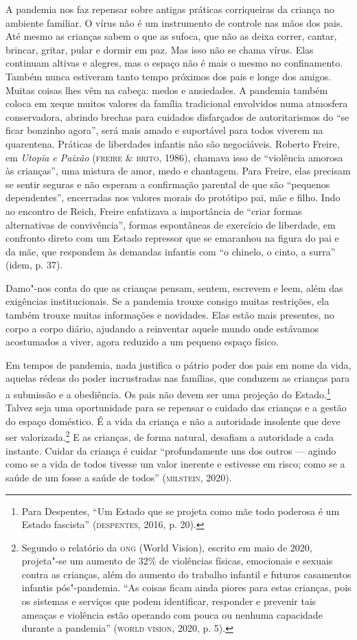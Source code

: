 A pandemia nos faz repensar sobre antigas práticas corriqueiras da
criança no ambiente familiar. O vírus não é um instrumento de controle
nas mãos dos pais. Até mesmo as crianças sabem o que as sufoca, que não
as deixa correr, cantar, brincar, gritar, pular e dormir em paz. Mas
isso não se chama vírus. Elas continuam altivas e alegres, mas o espaço
não é mais o mesmo no confinamento. Também nunca estiveram tanto tempo
próximos dos pais e longe dos amigos. Muitas coisas lhes vêm na cabeça:
medos e ansiedades. A pandemia também coloca em xeque muitos valores da
família tradicional envolvidos numa atmosfera conservadora, abrindo
brechas para cuidados disfarçados de autoritarismos do ``se ficar
bonzinho agora'', será mais amado e suportável para todos viverem na
quarentena. Práticas de liberdades infantis não são negociáveis. Roberto
Freire, em \emph{Utopia e Paixão} (\textsc{freire} \& \textsc{brito}, 1986), chamava isso
de ``violência amorosa às crianças'', uma mistura de amor, medo e
chantagem. Para Freire, elas precisam se sentir seguras e não esperam a
confirmação parental de que são ``pequenos dependentes'', encerradas nos
valores morais do protótipo pai, mãe e filho. Indo ao encontro de Reich,
Freire enfatizava a importância de ``criar formas alternativas de
convivência'', formas espontâneas de exercício de liberdade, em
confronto direto com um Estado repressor que se emaranhou na figura do
pai e da mãe, que respondem às demandas infantis com ``o chinelo, o
cinto, a surra'' (idem, p. 37).

Damo"-nos conta do que as crianças pensam, sentem, escrevem e leem, além
das exigências institucionais. Se a pandemia trouxe consigo muitas
restrições, ela também trouxe muitas informações e novidades. Elas estão
mais presentes, no corpo a corpo diário, ajudando a reinventar aquele
mundo onde estávamos acostumados a viver, agora reduzido a um pequeno
espaço físico.

Em tempos de pandemia, nada justifica o pátrio poder dos pais em nome da
vida, aquelas rédeas do poder incrustradas nas famílias, que conduzem as
crianças para a submissão e a obediência. Os pais não devem ser uma
projeção do Estado.\footnote{Para Despentes, ``Um Estado que se projeta
  como mãe todo poderosa é um Estado fascista'' (\textsc{despentes}, 2016, p.
  20).} Talvez seja uma oportunidade para se repensar o cuidado das
crianças e a gestão do espaço doméstico. É a vida da criança e não a
autoridade insolente que deve ser valorizada.\footnote{Segundo o
  relatório da \textsc{ong} (World Vision), escrito em maio de 2020, projeta"-se
  um aumento de 32\% de violências físicas, emocionais e sexuais contra
  as crianças, além do aumento do trabalho infantil e futuros casamentos
  infantis pós"-pandemia. ``As coisas ficam ainda piores para estas
  crianças, pois os sistemas e serviços que podem identificar, responder
  e prevenir tais ameaças e violência estão operando com pouca ou
  nenhuma capacidade durante a pandemia'' (\textsc{world vision}, 2020, p. 5).} E
as crianças, de forma natural, desafiam a autoridade a cada instante.
Cuidar da criança é cuidar ``profundamente uns dos outros --- agindo
como se a vida de todos tivesse um valor inerente e estivesse em risco;
como se a saúde de um fosse a saúde de todos'' (\textsc{milstein}, 2020).

